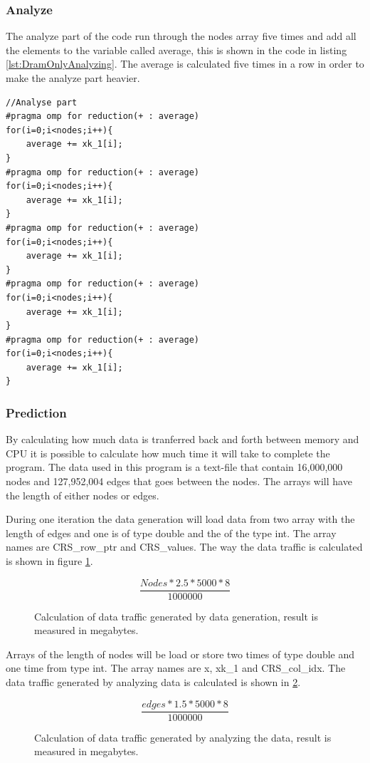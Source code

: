 \documentclass[12pt,a4paper,USenglish]{article}      %
\begin{document}
\clearpage
\subsubsection{Analyze}
\label{sec:dramOnlyAnalyze}
The analyze part of the code run through the nodes array five times and add all the elements to the variable called average, this is shown in the code in listing \ref{lst:DramOnlyAnalyzing}. The average is calculated five times in a row in order to make the analyze part heavier.

\begin{lstlisting}[caption={Analyzing the data.},escapeinside={{/*!}{!*/}}, label={lst:DramOnlyAnalyzing}]
//Analyse part
#pragma omp for reduction(+ : average)
for(i=0;i<nodes;i++){
	average += xk_1[i];
}
#pragma omp for reduction(+ : average)
for(i=0;i<nodes;i++){
	average += xk_1[i];
}
#pragma omp for reduction(+ : average)
for(i=0;i<nodes;i++){
	average += xk_1[i];
}
#pragma omp for reduction(+ : average)
for(i=0;i<nodes;i++){
	average += xk_1[i];
}
#pragma omp for reduction(+ : average)
for(i=0;i<nodes;i++){
	average += xk_1[i];
}
\end{lstlisting}

\subsubsection{Prediction}
\label{section:DramOnlyPrediction}
By calculating how much data is tranferred back and forth between memory and CPU it is possible to calculate how much time it will take to complete the program. The data used in this program is a text-file that contain 16,000,000 nodes and 127,952,004 edges that goes between the nodes. The arrays will have the length of either nodes or edges. 

During one iteration the data generation will load data from two array with the length of edges and one is of type double and the of the type int. The array names are CRS\_row\_ptr and CRS\_values.
The way the data traffic is calculated is shown in figure \ref{fig:DramOnlyMath1}.

\begin{figure}
\[
	\frac{Nodes*2.5*5000*8}{1000000}
\]
\caption{Calculation of data traffic generated by data generation, result is measured in megabytes.}
\label{fig:DramOnlyMath1}
\end{figure}

Arrays of the length of nodes will be load or store two times of type double and one time from type int. The array names are x, xk\_1 and CRS\_col\_idx.
The data traffic generated by analyzing data is calculated is shown in \ref{fig:DramOnlyMath2}.
\begin{figure}
\[
	\frac{edges*1.5*5000*8}{1000000}
\]
\caption{Calculation of data traffic generated by analyzing the data, result is measured in megabytes.}
\label{fig:DramOnlyMath2}
\end{figure}
\end{document}

